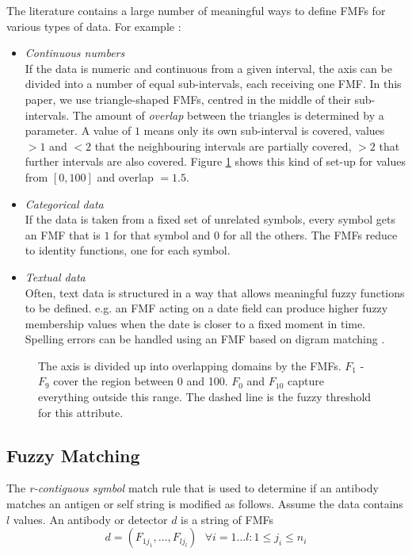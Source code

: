 \documentclass{llncs}
\begin{document}
The literature contains a large number of meaningful ways to define FMFs for various types of data.
For example :
\begin{itemize}
    \item{\it Continuous numbers} \\
    If the data is numeric and continuous from a given interval, the axis can be divided into a number of equal sub-intervals, each receiving one FMF.
    In this paper, we use triangle-shaped FMFs, centred in the middle of their sub-intervals.
    The amount of {\it overlap} between the triangles is determined by a parameter.
    A value of $1$ means only its own sub-interval is covered, values $> 1$ and $< 2$ that the neighbouring intervals are partially covered, $>2$ that further intervals are also covered. 
    Figure \ref{fig_fuzzy_real} shows this kind of set-up for values from $[0,100]$ and overlap $= 1.5$.
    \item{\it Categorical data} \\
    If the data is taken from a fixed set of unrelated symbols, every symbol gets an FMF that is $1$ for that symbol and $0$ for all the others.
    The FMFs reduce to identity functions, one for each symbol.
    \item{\it Textual data} \\
    Often, text data is structured in a way that allows meaningful fuzzy functions to be defined.
    e.g. an FMF acting on a date field can produce higher fuzzy membership values when the date is closer to a fixed moment in time.
    Spelling errors can be handled using an FMF based on digram matching \cite{fuhr}.
\end{itemize}

\begin{figure}[htbp]
\begin{center}
\caption{The axis is divided up into overlapping domains by the FMFs.
            $F_1$ - $F_9$ cover the region between 0 and 100. $F_0$ and $F_{10}$ capture everything outside this range.
            The dashed line is the fuzzy threshold for this attribute.
           }
   \label{fig_fuzzy_real}
\end{center}
\end{figure}

\subsection{Fuzzy Matching}
\label{ssec_fuzzy_match}
The {\it r-contiguous symbol} match rule that is used to determine if an antibody matches an antigen or self string is modified as follows.
Assume the data contains $l$ values.
An antibody or detector $d$ is a string of FMFs 
$$
  d = (F_{1j_1}, \ldots, F_{lj_l}) ~~~ \forall i=1 \ldots l : 1 \leq j_i \leq n_i
$$
\end{document}
